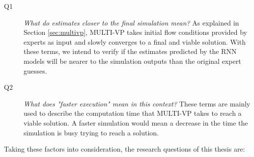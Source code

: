\begin{description}


    \item[Q1] \textit{What do estimates closer to the final simulation mean?} As explained in Section \ref{sec:multivp}, MULTI-VP takes initial flow conditions provided by experts as input and slowly converges to a final and viable solution. With these terms, we intend to verify if the estimates predicted by the RNN models will be nearer to the simulation outputs than the original expert guesses. 

    \item[Q2] \textit{What does "faster execution" mean in this context?} These terms are mainly used to describe the computation time that MULTI-VP takes to reach a viable solution. A faster simulation would mean a decrease in the time the simulation is busy trying to reach a solution. 
\end{description}


Taking these factors into consideration, the research questions of this thesis are:

